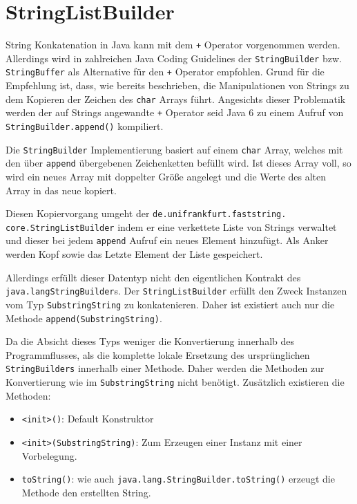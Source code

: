 \section{StringListBuilder} 

String Konkatenation in Java kann mit dem \texttt{+} Operator vorgenommen werden. Allerdings 
wird in zahlreichen Java Coding Guidelines der \texttt{StringBuilder} bzw. \texttt{StringBuffer}
als Alternative für den \texttt{+} Operator empfohlen. Grund für die Empfehlung ist,
dass, wie bereits beschrieben, die Manipulationen von Strings zu dem Kopieren der 
Zeichen des \texttt{char} Arrays führt. Angesichts dieser Problematik werden der auf Strings 
angewandte \texttt{+} Operator seid Java 6 zu einem Aufruf von \texttt{StringBuilder.append()} 
kompiliert.  

Die \texttt{StringBuilder} Implementierung basiert auf einem \texttt{char} Array, welches
mit den über \texttt{append} übergebenen Zeichenketten befüllt wird. Ist dieses Array voll,
so wird ein neues Array mit doppelter Größe angelegt und die Werte des alten Array in das 
neue kopiert.

Diesen Kopiervorgang umgeht der \texttt{de.unifrankfurt.faststring.\\core.StringListBuilder} 
indem er eine verkettete Liste von Strings verwaltet und dieser bei jedem \texttt{append} Aufruf 
ein neues Element hinzufügt. Als Anker werden Kopf sowie das Letzte Element der Liste gespeichert.

Allerdings erfüllt dieser Datentyp nicht den eigentlichen Kontrakt des \texttt{java.langStringBuilder}s.
Der \texttt{StringListBuilder} erfüllt den Zweck Instanzen vom Typ \texttt{SubstringString} 
zu konkatenieren. Daher ist existiert auch nur die Methode \texttt{append(SubstringString)}.

Da die Absicht dieses Typs weniger die Konvertierung innerhalb des Programmflusses, als die komplette
lokale Ersetzung des ursprünglichen \texttt{StringBuilders} innerhalb einer Methode. Daher 
werden die Methoden zur Konvertierung wie im \texttt{SubstringString} nicht benötigt. Zusätzlich 
existieren die Methoden:

\begin{itemize}
	\item \texttt{<init>()}: Default Konstruktor
	\item \texttt{<init>(SubstringString)}: Zum Erzeugen einer Instanz mit einer Vorbelegung.
	\item \texttt{toString()}: wie auch \texttt{java.lang.StringBuilder.toString()} erzeugt die Methode 
	den erstellten String.
\end{itemize}
